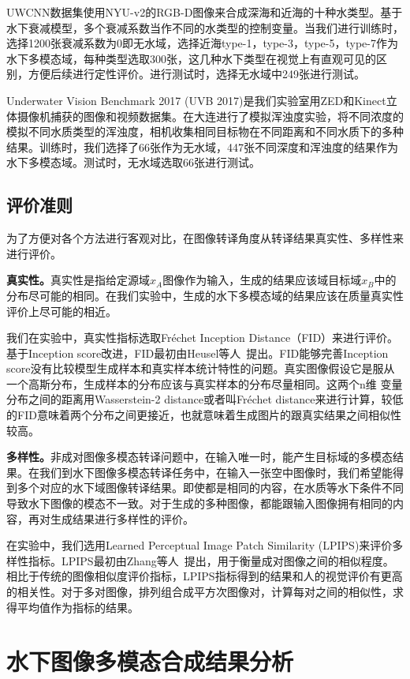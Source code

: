 UWCNN数据集使用NYU-v2的RGB-D图像来合成深海和近海的十种水类型。基于水下衰减模型，多个衰减系数当作不同的水类型的控制变量。当我们进行训练时，选择1200张衰减系数为0即无水域，选择近海type-1，type-3，type-5，type-7作为水下多模态域，每种类型选取300张，这几种水下类型在视觉上有直观可见的区别，方便后续进行定性评价。进行测试时，选择无水域中249张进行测试。

Underwater Vision Benchmark 2017 (UVB 2017)是我们实验室用ZED和Kinect立体摄像机捕获的图像和视频数据集。在大连进行了模拟浑浊度实验，将不同浓度的模拟不同水质类型的浑浊度，相机收集相同目标物在不同距离和不同水质下的多种结果。训练时，我们选择了66张作为无水域，447张不同深度和浑浊度的结果作为水下多模态域。测试时，无水域选取66张进行测试。

\subsection{评价准则}
为了方便对各个方法进行客观对比，在图像转译角度从转译结果真实性、多样性来进行评价。

\textbf{真实性。}真实性是指给定源域$x_A$图像作为输入，生成的结果应该域目标域$x_B$中的分布尽可能的相同。在我们实验中，生成的水下多模态域的结果应该在质量真实性评价上尽可能的相近。

我们在实验中，真实性指标选取Fréchet Inception Distance（FID）来进行评价。基于Inception score改进，FID最初由Heusel等人~\cite{heusel2017gans}提出。FID能够完善Inception score没有比较模型生成样本和真实样本统计特性的问题。真实图像假设它是服从一个高斯分布，生成样本的分布应该与真实样本的分布尽量相同。这两个n维
变量分布之间的距离用Wasserstein-2 distance或者叫Fréchet distance来进行计算，较低的FID意味着两个分布之间更接近，也就意味着生成图片的跟真实结果之间相似性较高。

\textbf{多样性。}非成对图像多模态转译问题中，在输入唯一时，能产生目标域的多模态结果。在我们到水下图像多模态转译任务中，在输入一张空中图像时，我们希望能得到多个对应的水下域图像转译结果。即使都是相同的内容，在水质等水下条件不同导致水下图像的模态不一致。对于生成的多种图像，都能跟输入图像拥有相同的内容，再对生成结果进行多样性的评价。

在实验中，我们选用Learned Perceptual Image Patch Similarity (LPIPS)来评价多样性指标。LPIPS最初由Zhang等人~\cite{zhang2018perceptual}提出，用于衡量成对图像之间的相似程度。相比于传统的图像相似度评价指标，LPIPS指标得到的结果和人的视觉评价有更高的相关性。对于多对图像，排列组合成平方次图像对，计算每对之间的相似性，求得平均值作为指标的结果。

\section{水下图像多模态合成结果分析}
